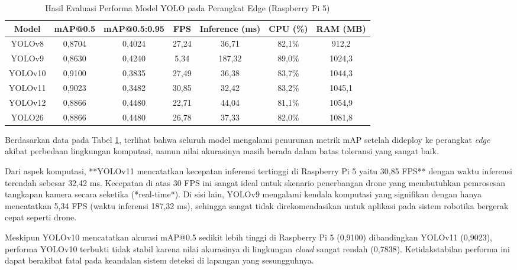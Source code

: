 \begin{table}[H]
  \centering
  \caption{Hasil Evaluasi Performa Model YOLO pada Perangkat Edge (Raspberry Pi 5)}
  \label{tb:evaluasi-raspi}
  \begin{tabular}{|c|c|c|c|c|c|c|}
    \hline
    \rowcolor[HTML]{C0C0C0}
    \textbf{Model} & \textbf{mAP@0.5} & \textbf{mAP@0.5:0.95} & \textbf{FPS} & \textbf{Inference (ms)} & \textbf{CPU (\%)} & \textbf{RAM (MB)} \\
    \hline
    YOLOv8  & 0,8704 & 0,4024 & 27,24 & 36,71 & 82,1\% & 912,2 \\
    YOLOv9  & 0,8630 & 0,4240 & 5,34  & 187,32 & 89,0\% & 1024,3 \\
    YOLOv10 & 0,9100 & 0,3835 & 27,49 & 36,38 & 83,7\% & 1044,3 \\
    YOLOv11 & 0,9023 & 0,3482 & 30,85 & 32,42 & 83,2\% & 1045,1 \\
    YOLOv12 & 0,8866 & 0,4480 & 22,71 & 44,04 & 81,1\% & 1054,9 \\
    YOLO26  & 0,8866 & 0,4480 & 26,78 & 37,33 & 82,0\% & 1081,8 \\
    \hline
  \end{tabular}
\end{table}

Berdasarkan data pada Tabel \ref{tb:evaluasi-raspi}, terlihat bahwa seluruh model mengalami penurunan metrik mAP setelah dideploy ke perangkat \emph{edge} akibat perbedaan lingkungan komputasi, namun nilai akurasinya masih berada dalam batas toleransi yang sangat baik. 

Dari aspek komputasi, **YOLOv11 mencatatkan kecepatan inferensi tertinggi di Raspberry Pi 5 yaitu 30,85 FPS** dengan waktu inferensi terendah sebesar 32,42 ms. Kecepatan di atas 30 FPS ini sangat ideal untuk skenario penerbangan drone yang membutuhkan pemrosesan tangkapan kamera secara seketika (*real-time*). Di sisi lain, YOLOv9 mengalami kendala komputasi yang signifikan dengan hanya mencatatkan 5,34 FPS (waktu inferensi 187,32 ms), sehingga sangat tidak direkomendasikan untuk aplikasi pada sistem robotika bergerak cepat seperti drone.

Meskipun YOLOv10 mencatatkan akurasi mAP@0.5 sedikit lebih tinggi di Raspberry Pi 5 (0,9100) dibandingkan YOLOv11 (0,9023), performa YOLOv10 terbukti tidak stabil karena nilai akurasinya di lingkungan \emph{cloud} sangat rendah (0,7838). Ketidakstabilan performa ini dapat berakibat fatal pada keandalan sistem deteksi di lapangan yang sesungguhnya.

